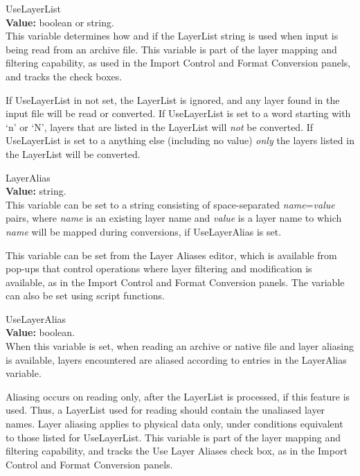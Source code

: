 \begin{description}
\item{\et UseLayerList}\\
{\bf Value:} boolean or string.\\
This variable determines how and if the {\et LayerList} string is used
when input is being read from an archive file.  This variable is part
of the layer mapping and filtering capability, as used in the {\cb
Import Control} and {\cb Format Conversion} panels, and tracks the
check boxes.

If {\et UseLayerList} in not set, the {\et LayerList} is ignored, and
any layer found in the input file will be read or converted.  If {\et
UseLayerList} is set to a word starting with `{\vt n}' or `{\vt N}',
layers that are listed in the {\et LayerList} will {\it not} be
converted.  If {\et UseLayerList} is set to a anything else (including
no value) {\it only} the layers listed in the {\et LayerList} will be
converted.

\item{\et LayerAlias}\\
{\bf Value:} string.\\
This variable can be set to a string consisting of space-separated
{\it name\/}={\it value} pairs, where {\it name} is an existing layer
name and {\it value} is a layer name to which {\it name} will be
mapped during conversions, if {\et UseLayerAlias} is set.

This variable can be set from the {\cb Layer Aliases} editor, which is
available from pop-ups that control operations where layer filtering
and modification is available, as in the {\cb Import Control} and {\cb
Format Conversion} panels.  The variable can also be set using script
functions.

\item{\et UseLayerAlias}\\
{\bf Value:} boolean.\\
When this variable is set, when reading an archive or native file and
layer aliasing is available, layers encountered are aliased according
to entries in the {\et LayerAlias} variable.

Aliasing occurs on reading only, after the {\et LayerList} is
processed, if this feature is used.  Thus, a {\et LayerList} used for
reading should contain the unaliased layer names.  Layer aliasing
applies to physical data only, under conditions equivalent to those
listed for {\et UseLayerList}.  This variable is part of the layer
mapping and filtering capability, and tracks the {\cb Use Layer
Aliases} check box, as in the {\cb Import Control} and {\cb
Format Conversion} panels.


\end{description}
